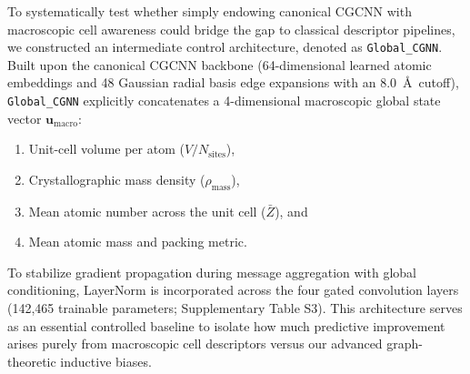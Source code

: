 \documentclass[journal,article,submit,moreauthors,pdftex]{article}
\begin{document}
To systematically test whether simply endowing canonical CGCNN with macroscopic cell awareness could bridge the gap to classical descriptor pipelines, we constructed an intermediate control architecture, denoted as \texttt{Global\_CGNN}. Built upon the canonical CGCNN backbone (64-dimensional learned atomic embeddings and 48 Gaussian radial basis edge expansions with an $8.0$~\AA\ cutoff), \texttt{Global\_CGNN} explicitly concatenates a 4-dimensional macroscopic global state vector $\mathbf{u}_{\mathrm{macro}}$:
\begin{enumerate}
    \item Unit-cell volume per atom ($V / N_{\mathrm{sites}}$),
    \item Crystallographic mass density ($\rho_{\mathrm{mass}}$),
    \item Mean atomic number across the unit cell ($\bar{Z}$), and
    \item Mean atomic mass and packing metric.
\end{enumerate}
To stabilize gradient propagation during message aggregation with global conditioning, LayerNorm is incorporated across the four gated convolution layers (142,465 trainable parameters; Supplementary Table S3). This architecture serves as an essential controlled baseline to isolate how much predictive improvement arises purely from macroscopic cell descriptors versus our advanced graph-theoretic inductive biases.
\end{document}
